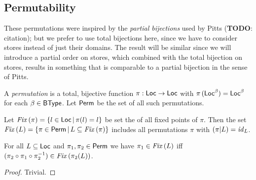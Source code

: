\documentclass[12pt,a4paper]{report}
\newcommand{\BType}{\sstyle{BType}}
\newcommand{\id}{\nstyle{id}}
\newcommand{\Fix}[1]{\nstyle{Fix}\,(#1)}
\begin{document}

\subsection{Permutability}

These permutations were inspired by the {\em partial bijections} used by Pitts ({\bf TODO}: citation);
but we prefer to use total bijections here, since we have to consider stores instead of just their domains.
The result will be similar since we will introduce a partial order on stores, which combined with the
total bijection on stores, results in something that is comparable to a partial bijection in the sense
of Pitts.

\begin{definition}[Permutation]
  A {\em permutation} is a total, bijective function $\pi:\mathsf{Loc}\to\mathsf{Loc}$ with
  $\pi\,(\mathsf{Loc}^\beta)=\mathsf{Loc}^\beta$ for each $\beta\in\BType$. Let $\mathsf{Perm}$ be the
  set of all such permutations.
\end{definition}

Let $\Fix{\pi} = \{l\in\Loc\,|\,\pi(l)=l\}$ be set the of all fixed points of $\pi$. Then
the set $\Fix{L} = \{\pi\in\Perm\,|\,L \subseteq \Fix{\pi}\}$ includes all
permutations $\pi$ with $(\pi|L) = \id_L$.

\begin{lemma}
  For all $L \subseteq \mathsf{Loc}$ and $\pi_1,\pi_2\in\mathsf{Perm}$ we have
  $\pi_1\in\Fix{L}$ iff $(\pi_2 \circ \pi_1 \circ \pi_2^{-1})\in\Fix{{\pi_2(L)}}$.
\end{lemma}

\begin{proof}
  Trivial.
\end{proof}
\end{document}
